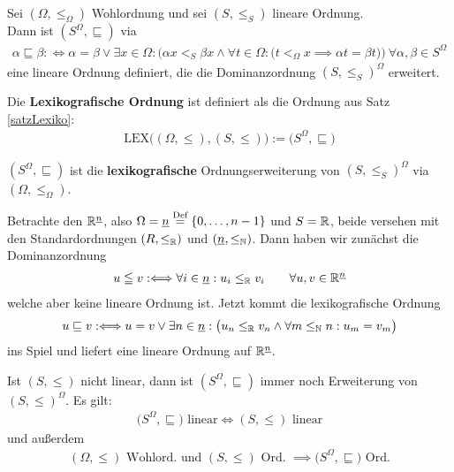 \begin{satz}\label{satzLexiko}
	Sei $(\Omega,\leq_\Omega)$ Wohlordnung und sei $(S,\leq_S)$ lineare Ordnung.\\
	Dann ist $(S^\Omega,\sqsubseteq)$ via
	\begin{align*}
		\alpha\sqsubseteq\beta:\Longleftrightarrow\alpha=\beta\vee\exists x\in\Omega:\Big(\alpha x<_S\beta x\wedge\forall t\in\Omega:\big(t<_\Omega x\implies \alpha t=\beta t\big)\Big)
		~\forall\alpha,\beta\in S^\Omega
		\end{align*}
	eine lineare Ordnung definiert, die die Dominanzordnung $(S,\leq_S)^\Omega$ erweitert.
\end{satz}

\begin{definition}
	Die \textbf{Lexikografische Ordnung} ist definiert als die Ordnung aus Satz \ref{satzLexiko}:
	\begin{align*}
		\text{LEX}\big((\Omega,\leq),(S,\leq)\big):=\big(S^\Omega,\sqsubseteq\big)
	\end{align*}
\end{definition}

\begin{bemerkung}
	$(S^\Omega,\sqsubseteq)$ ist die \textbf{lexikografische} Ordnungserweiterung von $(S,\leq_S)^\Omega$ via $(\Omega,\leq_\Omega)$.
\end{bemerkung}

\begin{beispiel}
	Betrachte den $\mathbb{R}^{\underline{n}}$, also $\Omega=\underline{n}\overset{\text{Def}}{=}\lbrace0,\ldots,n-1\rbrace$ und $S=\mathbb{R}$, beide versehen mit den Standardordnungen $(R,\leq_{\mathbb{R}})$ und $(\underline{n},\leq_{\mathbb{N}})$.
	Dann haben wir zunächst die Dominanzordnung
	\begin{align*}
		u\leqq v:\Longleftrightarrow \forall i\in\underline{n}:u_i\leq_{\mathbb{R}} v_i\qquad\forall u,v\in\mathbb{R}^{\underline{n}}
	\end{align*}
	welche aber keine lineare Ordnung ist.
	Jetzt kommt die lexikografische Ordnung
	\begin{align*}
		u\sqsubseteq v:\Longleftrightarrow u=v\vee\exists n\in\underline{n}:
		\big(u_n\leq_{\mathbb{R}} v_n\wedge\forall m\leq_{\mathbb{N}} n: u_m=v_m\big)
	\end{align*}
	ins Spiel und liefert eine lineare Ordnung auf $\mathbb{R}^{\underline{n}}$.
\end{beispiel}

Ist $(S,\leq)$ nicht linear, dann ist $(S^\Omega,\sqsubseteq)$ immer noch Erweiterung von $(S,\leq)^\Omega$.
Es gilt:
\begin{align*}
	\big(S^\Omega,\sqsubseteq\big)\text{ linear}\Longleftrightarrow(S,\leq)\text{ linear}
\end{align*}
und außerdem
\begin{align*}
	(\Omega,\leq)\text{ Wohlord. und }(S,\leq)\text{ Ord. }\implies\big(S^\Omega,\sqsubseteq\big)\text{ Ord.}
\end{align*}


